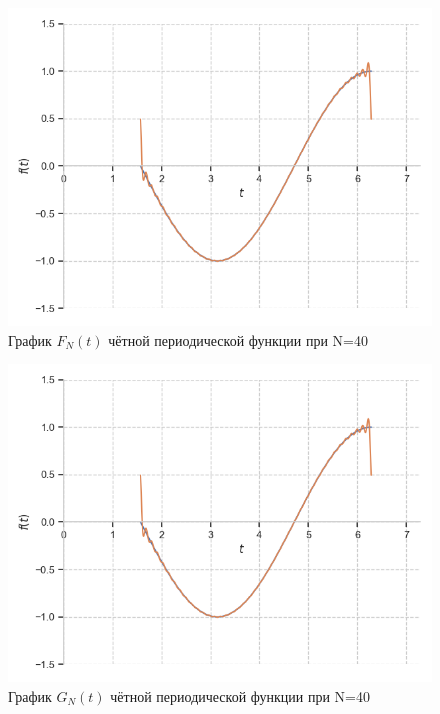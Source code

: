 \documentclass[a4paper, 16pt]{article}
\begin{document}
\begin{figure}[!htb]
    \centering
    \includegraphics[scale=0.8]{fur_cos_n=40.png}
    \captionsetup{skip=0pt}
    \caption{График $F_N(t)$ чётной периодической функции при N=40}
    \label{Рис:19}
\end{figure}
\begin{figure}[!htb]
    \centering
    \includegraphics[scale=0.8]{cfur_cos_n=40.png}
    \captionsetup{skip=0pt}
    \caption{График $G_N(t)$ чётной периодической функции при N=40}
    \label{Рис:20}
\end{figure}
\newpage
\end{document}
